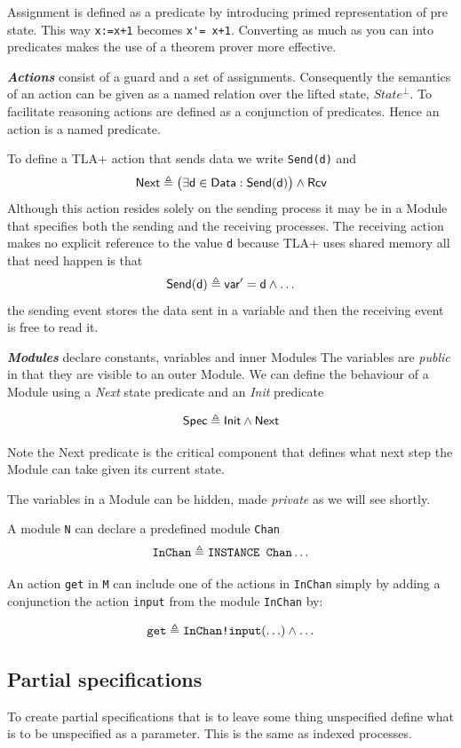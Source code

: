 \documentclass[]{article}
\begin{document}
Assignment is defined as a predicate by introducing primed representation of pre state. This way \verb$x:=x+1$ becomes \verb$x'= x+1$.  Converting as much as you can into predicates  makes  the use of a theorem prover more effective.

\emph{\bf Actions} consist of a guard and a set of assignments. Consequently  the semantics of an action can be given as a named relation over the lifted state, $State^{\bot}$.
To facilitate reasoning actions are defined as  a conjunction of predicates. Hence an action is a named predicate.




To define a TLA+ action that sends data we write \verb|Send(d)| and
\[{\sf Next \triangleq \big(\exists d\in Data : Send(d)\big) \land Rcv }\]
Although this action resides solely on the sending process it may be in a Module that specifies both the sending and the receiving processes.
The receiving action makes no explicit reference to the value \verb|d| because TLA+ uses shared memory all that need happen is that
\[ {\sf Send(d) \triangleq var' = d\land \ldots}\]
the sending event stores the data sent in a variable and then the receiving event is free to read it.


\emph{\bf Modules} declare constants, variables and inner Modules
 The variables are \emph{public} in that they are visible to an outer Module.
 We can define the behaviour of a Module using a \emph{\sf Next} state predicate and an \emph{\sf Init} predicate

 \[{\sf Spec \triangleq Init \land Next}\]

 Note the {\sf Next} predicate is the critical component that defines what next step the Module can take given its current state.

 The  variables in a Module can be hidden, made \emph{private} as we will see shortly.


A module \verb|N| can declare a predefined module  \verb|Chan|
\[\verb|InChan| \triangleq  \verb|INSTANCE Chan|\ldots\]




 \noindent An action \verb|get| in \verb|M| can include one of the actions in \verb|InChan| simply by adding a conjunction the action \verb|input| from the module \verb|InChan| by:

\[ \verb|get| \triangleq \verb|InChan!input|(\ldots) \land \ldots\]

\subsection{Partial specifications}
To create partial specifications that is to leave some thing unspecified define what is to be unspecified  as a parameter.  This is the same as  indexed processes.
\end{document}
